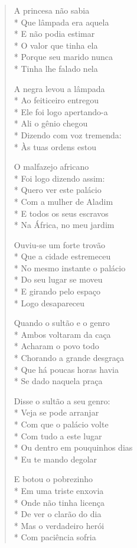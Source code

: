 \begin{verse}
A princesa não sabia\\*
Que lâmpada era aquela\\*
E não podia estimar\\*
O valor que tinha ela\\*
Porque seu marido nunca\\*
Tinha lhe falado nela

A negra levou a lâmpada\\*
Ao feiticeiro entregou\\*
Ele foi logo apertando-a\\*
Ali o gênio chegou\\*
Dizendo com voz tremenda:\\*
Às tuas ordens estou

O malfazejo africano\\*
Foi logo dizendo assim:\\*
Quero ver este palácio\\*
Com a mulher de Aladim\\*
E todos os seus escravos\\*
Na África, no meu jardim

Ouviu-se um forte trovão\\*
Que a cidade estremeceu\\*
No mesmo instante o palácio\\*
Do seu lugar se moveu\\*
E girando pelo espaço\\*
Logo desapareceu

Quando o sultão e o genro\\*
Ambos voltaram da caça\\*
Acharam o povo todo\\*
Chorando a grande desgraça\\*
Que há poucas horas havia\\*
Se dado naquela praça

Disse o sultão a seu genro:\\*
Veja se pode arranjar\\*
Com que o palácio volte\\*
Com tudo a este lugar\\*
Ou dentro em pouquinhos dias\\*
Eu te mando degolar

E botou o pobrezinho\\*
Em uma triste enxovia\\*
Onde não tinha licença\\*
De ver o clarão do dia\\*
Mas o verdadeiro herói\\*
Com paciência sofria


\end{verse}
